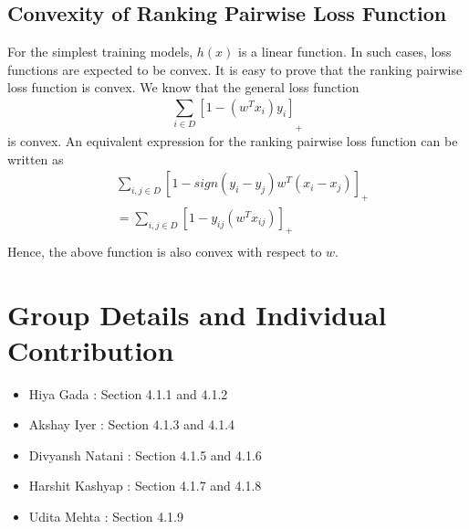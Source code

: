 \documentclass[11pt, twosides]{article}
\begin{document}
\subsection{Convexity of Ranking Pairwise Loss Function}
For the simplest training models, $h(x)$ is a linear function. In such cases, loss functions are expected to be convex.
It is easy to prove that the ranking pairwise loss function is convex. 
We know that the general loss function \[{{\sum\limits_{i\in D}^{{}}{\left[ 1-\left( {{w}^{T}}{{x}_{i}} \right){{y}_{i}} \right]}}_{+}}\] is convex.
An equivalent expression for the ranking pairwise loss function can be written as
\[\begin{align}
  & {{\sum\limits_{i,j\in D}^{{}}{\left[ 1-sign({{y}_{i}}-{{y}_{j}}){{w}^{T}}({{x}_{i}}-{{x}_{j}}) \right]}}_{+}} \\ 
 & ={{\sum\limits_{i,j\in D}^{{}}{\left[ 1-{{y}_{ij}}\left( {{w}^{T}}{{x}_{ij}} \right) \right]}}_{+}} \\ 
\end{align}\]
Hence, the above function is also convex with respect to $w$.


\section{Group Details and Individual Contribution}

\begin{itemize}
    \item Hiya Gada : Section 4.1.1 and 4.1.2
    \item Akshay Iyer : Section 4.1.3 and 4.1.4
    \item Divyansh Natani : Section 4.1.5 and 4.1.6
    \item Harshit Kashyap : Section 4.1.7 and 4.1.8
    \item Udita Mehta : Section 4.1.9
\end{itemize}
\end{document}
